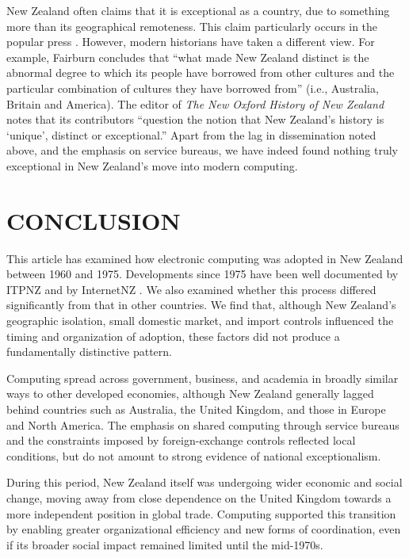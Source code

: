 \documentclass{IEEEcsmag}
\begin{document}
New Zealand often claims that it is exceptional as a country, due to something more than its geographical remoteness. This claim particularly occurs in the popular press \cite{Frykberg-2025}. However, modern historians have taken a different view. For example, Fairburn \cite{Fairburn-2008} concludes that “what made New Zealand distinct is the
abnormal degree to which its people have borrowed from other cultures and
the particular combination of cultures they have borrowed from” (i.e., Australia, Britain and America). The editor of \textit{The New Oxford History of New Zealand} notes that its contributors “question the notion that New Zealand’s history is ‘unique’, distinct or exceptional.” \cite{Byrnes-2007} Apart from the lag in dissemination noted above, and the emphasis on service bureaus, we have indeed found nothing truly exceptional in New Zealand’s move into modern computing.
\vspace*{-8pt}
\section{CONCLUSION}
This article has examined how electronic computing was adopted in New Zealand between 1960 and 1975. 
Developments since 1975 have been well documented by ITPNZ \cite{ITPNZ} and by InternetNZ \cite{ConnectingClouds}.
We also examined whether this process differed significantly from that in other countries. We find that, although New Zealand's geographic isolation, small domestic market, and import controls influenced the timing and organization of adoption, these factors did not produce a fundamentally distinctive pattern.

Computing spread across government, business, and academia in broadly similar ways to other developed economies, although New Zealand generally lagged behind countries such as Australia, the United Kingdom, and those in Europe and North America. The emphasis on shared computing through service bureaus and the constraints imposed by foreign-exchange controls reflected local conditions, but do not amount to strong evidence of national exceptionalism.

During this period, New Zealand itself was undergoing wider economic and social change, moving away from close dependence on the United Kingdom towards a more independent position in global trade. Computing supported this transition by enabling greater organizational efficiency and new forms of coordination, even if its broader social impact remained limited until the mid-1970s.
\end{document}
